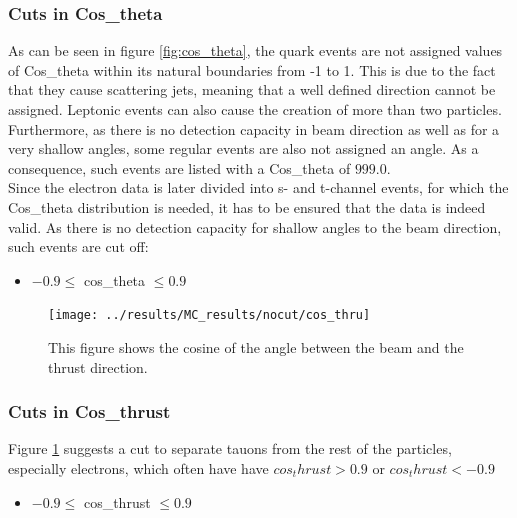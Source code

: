 \subsubsection{Cuts in Cos\_theta}
As can be seen in figure \ref{fig:cos_theta}, the quark events are not assigned values of Cos\_theta within its natural boundaries from -1 to 1. This is due to the fact that they cause scattering jets, meaning that a well defined direction cannot be assigned. Leptonic events can also cause the creation of more than two particles. Furthermore, as there is no detection capacity in beam direction as well as for a very shallow angles, some regular events are also not assigned an angle. As a consequence, such events are listed with a Cos\_theta of $999.0$.\\
Since the electron data is later divided into s- and t-channel events, for which the Cos\_theta distribution is needed, it has to be ensured that the data is indeed valid. As there is no detection capacity for shallow angles to the beam direction, such events are cut off:

\begin{itemize}
	\item{ $-0.9\le$ cos\_theta $\le0.9$}
\end{itemize}

\newpage
\begin{figure}[H]
\centering
\texttt{[image: ../results/MC\_results/nocut/cos\_thru]}
\caption[Cos\_thru in simulation data]{This figure shows the cosine of the angle between the beam and the thrust direction.}
\label{fig:cos_thru}
\end{figure}

\subsubsection{Cuts in Cos\_thrust}
Figure \ref{fig:cos_thru} suggests a cut to separate tauons from the rest of the particles, especially electrons, which often have have $cos_thrust>0.9$ or $cos_thrust<-0.9$

\begin{itemize}
	\item{ $-0.9\le$ cos\_thrust $\le0.9$}
\end{itemize}

